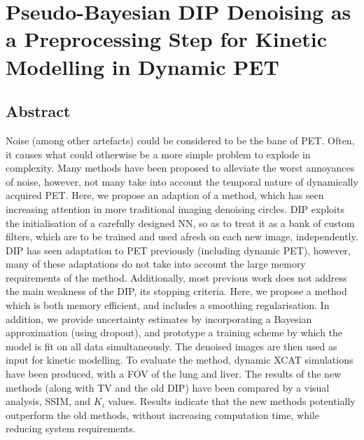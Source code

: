 \chapter{Pseudo-Bayesian DIP Denoising as a Preprocessing Step for Kinetic Modelling in Dynamic PET} \label{sec:pseudo_bayesian_dip_denoising_as_a_preprocessing_step_for_kinetic_modelling_in_dynamic_pet_appendix}
    \newpage

    \section{Abstract} \label{sec:pseudo_bayesian_dip_denoising_as_a_preprocessing_step_for_kinetic_modelling_in_dynamic_pet_appendix_abstract}
        Noise (among other artefacts) could be considered to be the bane of \gls{PET}. Often, it causes what could otherwise be a more simple problem to explode in complexity. Many methods have been proposed to alleviate the worst annoyances of noise, however, not many take into account the temporal nature of dynamically acquired \gls{PET}. Here, we propose an adaption of a method, which has seen increasing attention in more traditional imaging denoising circles. \gls{DIP} exploits the initialisation of a carefully designed \gls{NN}, so as to treat it as a bank of custom filters, which are to be trained and used afresh on each new image, independently. \gls{DIP} has seen adaptation to \gls{PET} previously (including dynamic \gls{PET}), however, many of these adaptations do not take into account the large memory requirements of the method. Additionally, most previous work does not address the main weakness of the \gls{DIP}, its stopping criteria. Here, we propose a method which is both memory efficient, and includes a smoothing regularisation. In addition, we provide uncertainty estimates by incorporating a Bayesian approximation (using dropout), and prototype a training scheme by which the model is fit on all data simultaneously. The denoised images are then used as input for kinetic modelling. To evaluate the method, dynamic \gls{XCAT} simulations have been produced, with a \gls{FOV} of the lung and liver. The results of the new methods (along with \gls{TV} and the old \gls{DIP}) have been compared by a visual analysis, \gls{SSIM}, and $K_i$ values. Results indicate that the new methods potentially outperform the old methods, without increasing computation time, while reducing system requirements.

